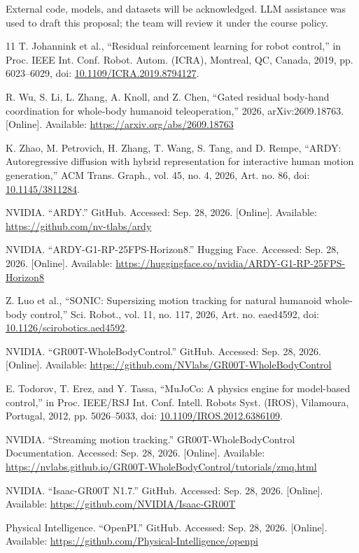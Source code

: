 \documentclass[11pt,a4paper]{article}
\begin{document}
{\small External code, models, and datasets will be acknowledged. LLM assistance
was used to draft this proposal; the team will review it under the course policy.\par}

\clearpage
\begingroup
\small
\raggedright
\setlength{\parskip}{1pt}
\begin{thebibliography}{11}
\setlength{\itemsep}{7pt}
T. Johannink et al., ``Residual reinforcement learning for robot
control,'' in Proc. IEEE Int. Conf. Robot. Autom. (ICRA), Montreal,
QC, Canada, 2019, pp. 6023--6029, doi:
\href{https://doi.org/10.1109/ICRA.2019.8794127}{10.1109/ICRA.2019.8794127}.

R. Wu, S. Li, L. Zhang, A. Knoll, and Z. Chen, ``Gated residual body-hand
coordination for whole-body humanoid teleoperation,'' 2026,
arXiv:2609.18763. [Online]. Available: \url{https://arxiv.org/abs/2609.18763}

K. Zhao, M. Petrovich, H. Zhang, T. Wang, S. Tang, and D. Rempe,
``ARDY: Autoregressive diffusion with hybrid representation for interactive
human motion generation,'' ACM Trans. Graph., vol. 45, no. 4,
2026, Art. no. 86, doi:
\href{https://doi.org/10.1145/3811284}{10.1145/3811284}.

NVIDIA. ``ARDY.'' GitHub. Accessed: Sep. 28, 2026. [Online]. Available:
\url{https://github.com/nv-tlabs/ardy}

NVIDIA. ``ARDY-G1-RP-25FPS-Horizon8.'' Hugging Face.
Accessed: Sep. 28, 2026. [Online]. Available:
\url{https://huggingface.co/nvidia/ARDY-G1-RP-25FPS-Horizon8}

Z. Luo et al., ``SONIC: Supersizing motion tracking for natural
humanoid whole-body control,'' Sci. Robot., vol. 11, no. 117,
2026, Art. no. eaed4592, doi:
\href{https://doi.org/10.1126/scirobotics.aed4592}{10.1126/scirobotics.aed4592}.

NVIDIA. ``GR00T-WholeBodyControl.'' GitHub.
Accessed: Sep. 28, 2026. [Online]. Available:
\url{https://github.com/NVlabs/GR00T-WholeBodyControl}

E. Todorov, T. Erez, and Y. Tassa, ``MuJoCo: A physics engine for model-based
control,'' in Proc. IEEE/RSJ Int. Conf. Intell. Robots Syst. (IROS),
Vilamoura, Portugal, 2012, pp. 5026--5033, doi:
\href{https://doi.org/10.1109/IROS.2012.6386109}{10.1109/IROS.2012.6386109}.

NVIDIA. ``Streaming motion tracking.'' GR00T-WholeBodyControl
Documentation. Accessed: Sep. 28, 2026. [Online]. Available:
\url{https://nvlabs.github.io/GR00T-WholeBodyControl/tutorials/zmq.html}

NVIDIA. ``Isaac-GR00T N1.7.'' GitHub.
Accessed: Sep. 28, 2026. [Online]. Available:
\url{https://github.com/NVIDIA/Isaac-GR00T}

Physical Intelligence. ``OpenPI.'' GitHub.
Accessed: Sep. 28, 2026. [Online]. Available:
\url{https://github.com/Physical-Intelligence/openpi}
\end{thebibliography}
\endgroup
\end{document}
